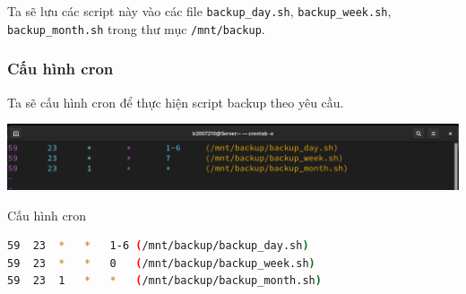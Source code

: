 \documentclass[a4paper, 11pt]{article}
\begin{document}
Ta sẽ lưu các script này vào các file \texttt{backup\_day.sh}, \texttt{backup\_week.sh}, \texttt{backup\_month.sh} trong thư mục \texttt{/mnt/backup}.

\subsubsection{Cấu hình cron}

Ta sẽ cấu hình cron để thực hiện script backup theo yêu cầu.

\begin{minipage}
    {\linewidth}
    \captionsetup{type=figure}
    \centering
    \includegraphics[width=\linewidth]{images/crontab.png}
    \caption{Cấu hình cron}
    \label{figure:crontab}
\end{minipage}

\begin{lstlisting}[language=bash, caption={Cấu hình cron}]
59  23  *   *   1-6 (/mnt/backup/backup_day.sh)
59  23  *   *   0   (/mnt/backup/backup_week.sh)
59  23  1   *   *   (/mnt/backup/backup_month.sh)
\end{lstlisting}
\end{document}
